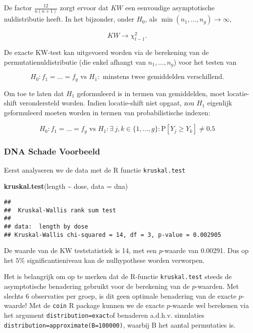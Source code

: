 \documentclass[
  12pt,dutch,coursenotes]{book}
\newenvironment{Shaded}{\begin{snugshade}}{\end{snugshade}}
\newcommand{\DataTypeTok}[1]{\textcolor[rgb]{0.13,0.29,0.53}{#1}}
\newcommand{\KeywordTok}[1]{\textcolor[rgb]{0.13,0.29,0.53}{\textbf{#1}}}
\newcommand{\NormalTok}[1]{#1}
\newcommand{\OperatorTok}[1]{\textcolor[rgb]{0.81,0.36,0.00}{\textbf{#1}}}
\newcommand{\StringTok}[1]{\textcolor[rgb]{0.31,0.60,0.02}{#1}}
\theoremstyle{definition}
\theoremstyle{definition}
\theoremstyle{definition}
\theoremstyle{remark}
\begin{document}
De factor \(\frac{12}{n(n+1)}\) zorgt ervoor dat \(KW\) een eenvoudige asymptotische nuldistributie heeft. In het bijzonder, onder \(H_0\), als \(\min(n_1,\ldots, n_g)\rightarrow \infty\),

\[
    KW  \rightarrow \chi^2_{t-1}.
  \]

De exacte KW-test kan uitgevoerd worden via de berekening van de permutatienuldistributie (die enkel afhangt van \(n_1, \ldots, n_g\)) voor het testen van

\[H_0: f_1=\ldots=f_g \text{ vs } H_1: \text{ minstens twee gemiddelden verschillend}.\]

Om toe te laten dat \(H_1\) geformuleerd is in termen van gemiddelden, moet locatie-shift verondersteld worden. Indien locatie-shift niet opgaat, zou \(H_1\) eigenlijk geformuleerd moeten worden in termen van probabilistische indexen:

\[H_0: f_1=\ldots=f_g \text{ vs } H_1: \exists\ j,k \in \{1,\ldots,g\} : \text{P}\left[Y_j\geq Y_k\right]\neq 0.5\]

\hypertarget{dna-schade-voorbeeld}{%
\subsubsection{DNA Schade Voorbeeld}\label{dna-schade-voorbeeld}}

Eerst analyseren we de data met de R functie \texttt{kruskal.test}

\begin{Shaded}
\begin{Highlighting}[]
\KeywordTok{kruskal.test}\NormalTok{(length }\OperatorTok{\textasciitilde{}}\StringTok{ }\NormalTok{dose, }\DataTypeTok{data =}\NormalTok{ dna)}
\end{Highlighting}
\end{Shaded}

\begin{verbatim}
## 
##  Kruskal-Wallis rank sum test
## 
## data:  length by dose
## Kruskal-Wallis chi-squared = 14, df = 3, p-value = 0.002905
\end{verbatim}

De waarde van de KW teststatistiek is 14, met een \(p\)-waarde van 0.00291. Dus op het \(5\%\) significantieniveau kan de nulhypothese worden verworpen.

Het is belangrijk om op te merken dat de R-functie \texttt{kruskal.test} steeds de asymptotische benadering gebruikt voor de berekening van de \(p\)-waarden. Met slechts 6 observaties per groep, is dit geen optimale benadering van de exacte \(p\)-waarde!
Met de \texttt{coin} R package kunnen we de exacte \(p\)-waarde wel berekenen via het argument \texttt{distribution=\textquotesingle{}exact\textquotesingle{}}of benaderen a.d.h.v. simulaties \texttt{distribution=approximate(B=100000)}, waarbij B het aantal permutaties is.
\end{document}

